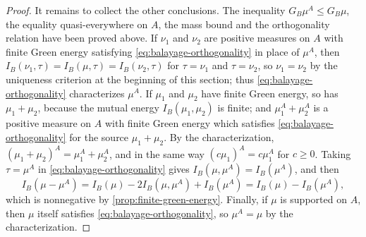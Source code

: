\begin{proof}
It remains to collect the other conclusions. The inequality $G_B\mu^A\leq G_B\mu$, the equality quasi-everywhere on $A$, the mass bound and the orthogonality relation have been proved above. If $\nu_1$ and $\nu_2$ are positive measures on $A$ with finite Green energy satisfying \eqref{eq:balayage-orthogonality} in place of $\mu^A$, then $I_B(\nu_1,\tau)=I_B(\mu,\tau)=I_B(\nu_2,\tau)$ for $\tau=\nu_1$ and $\tau=\nu_2$, so $\nu_1=\nu_2$ by the uniqueness criterion at the beginning of this section; thus \eqref{eq:balayage-orthogonality} characterizes $\mu^A$. If $\mu_1$ and $\mu_2$ have finite Green energy, so has $\mu_1+\mu_2$, because the mutual energy $I_B(\mu_1,\mu_2)$ is finite; and $\mu_1^A+\mu_2^A$ is a positive measure on $A$ with finite Green energy which satisfies \eqref{eq:balayage-orthogonality} for the source $\mu_1+\mu_2$. By the characterization, $(\mu_1+\mu_2)^A=\mu_1^A+\mu_2^A$, and in the same way $(c\mu_1)^A=c\mu_1^A$ for $c\geq0$. Taking $\tau=\mu^A$ in \eqref{eq:balayage-orthogonality} gives $I_B(\mu,\mu^A)=I_B(\mu^A)$, and then
\[
 I_B(\mu-\mu^A)=I_B(\mu)-2I_B(\mu,\mu^A)+I_B(\mu^A)=I_B(\mu)-I_B(\mu^A),
\]
which is nonnegative by \cref{prop:finite-green-energy}. Finally, if $\mu$ is supported on $A$, then $\mu$ itself satisfies \eqref{eq:balayage-orthogonality}, so $\mu^A=\mu$ by the characterization.
\end{proof}

